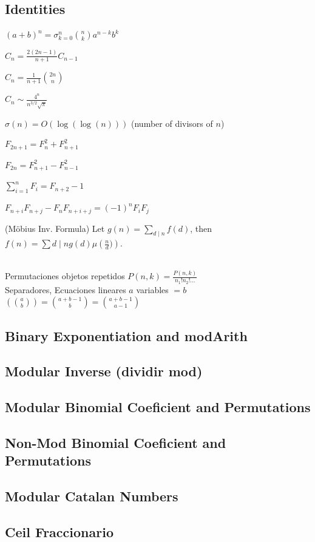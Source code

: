 \subsection{Identities}
{
$(a+b)^{n} = \sigma_{k = 0}^{n} \binom{n}{k}a^{n-k}b^{k}$

$C_n = \frac{2(2n-1)}{n+1} C_{n-1}$

$C_n = \frac{1}{n+1} \binom{2n}{n}$

$C_n \sim \frac{4^n}{n^{3/2}\sqrt{\pi}}$

$\sigma(n) = O(\log(\log(n)))$ (number of divisors of $n$)

$F_{2n+1} = F_{n}^2 + F_{n+1}^2$

$F_{2n} = F_{n+1}^2 - F_{n-1}^2$

$\sum_{i=1}^n F_i = F_{n+2}-1$

$F_{n+i}F_{n+j} - F_nF_{n+i+j} = (-1)^n F_iF_j$

(Möbius Inv. Formula)
Let $g(n) = \sum_{d\mid n} f(d)$, then $f(n)=\sum{d\mid n} g(d) \mu\left(\frac{n}{d})\right)$.
}
\\
Permutaciones objetos repetidos
$P(n,k) = \frac{P(n,k)}{n_{1}!n_{2}!...}$ 
\\
Separadores, Ecuaciones lineares $a$ variables $= b$  
$\left(\binom{a}{b}\right) = \binom{a+b-1}{b} = \binom{a+b-1}{a-1}$
\subsection{Binary Exponentiation and modArith}
\subsection{Modular Inverse (dividir mod)}
\subsection{Modular Binomial Coeficient and Permutations}
\subsection{Non-Mod Binomial Coeficient and Permutations}
\subsection{Modular Catalan Numbers}
\subsection{Ceil Fraccionario}

